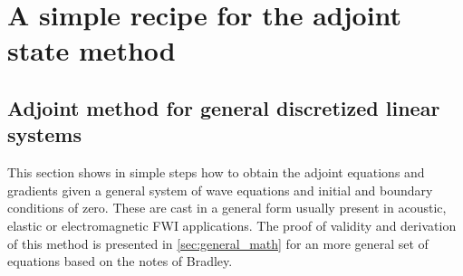 \documentclass[10pt]{SelfArx} %
\theoremstyle{definition}
\begin{document}


\section{A simple recipe for the adjoint state method}


\subsection{Adjoint method for general discretized linear systems}\label{sec:discretized_math}
This section shows in simple steps how to obtain the adjoint equations and gradients given a general system of wave equations and initial and boundary conditions of zero. These are cast in a general form usually present in acoustic, elastic or electromagnetic FWI applications. The proof of validity and derivation of this method is presented in \cref{sec:general_math} for an more general set of equations based on the notes of Bradley\cite{Bradley2012}.
\end{document}
